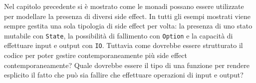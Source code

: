 Nel capitolo precedente si è mostrato come le monadi possano essere utilizzate per modellare la presenza di diversi side effect. In tutti gli esempi mostrati viene sempre gestita una sola tipologia di side effect per volta: la presenza di uno stato mutabile con \lstinline{State}, la possibilità di fallimento con \lstinline{Option} e la capacità di effettuare input e output con \lstinline{IO}. Tuttavia come dovrebbe essere strutturato il codice per poter gestire contemporaneamente più side effect contemporaneamente? Quale dovrebbe essere il tipo di una funzione per rendere esplicito il fatto che può sia fallire che effettuare operazioni di input e output?

